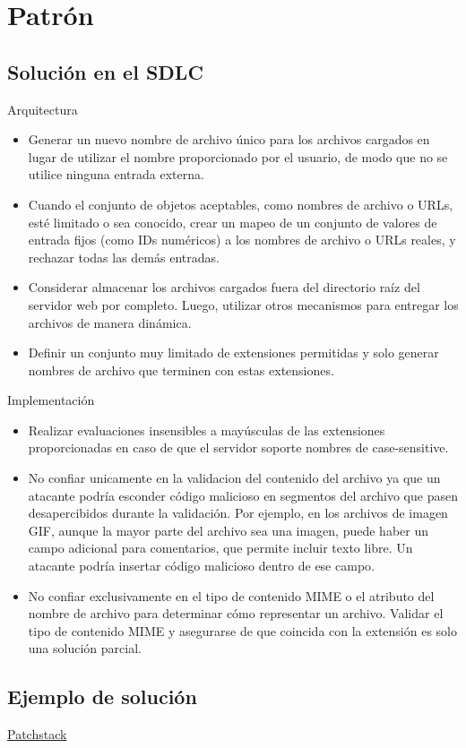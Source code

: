\section{Patrón}
\subsection*{Solución en el SDLC}
Arquitectura
\begin{itemize}
    \item Generar un nuevo nombre de archivo único para los archivos cargados en lugar de utilizar el nombre proporcionado por el usuario, de modo que no se utilice ninguna entrada externa.
    \item Cuando el conjunto de objetos aceptables, como nombres de archivo o URLs, esté limitado o sea conocido, crear un mapeo de un conjunto de valores de entrada fijos (como IDs numéricos) a los nombres de archivo o URLs reales, y rechazar todas las demás entradas.
    \item Considerar almacenar los archivos cargados fuera del directorio raíz del servidor web por completo. Luego, utilizar otros mecanismos para entregar los archivos de manera dinámica.
    \item Definir un conjunto muy limitado de extensiones permitidas y solo generar nombres de archivo que terminen con estas extensiones.
\end{itemize}

Implementación
\begin{itemize}
    \item Realizar evaluaciones insensibles a mayúsculas de las extensiones proporcionadas en caso de que el servidor soporte nombres de case-sensitive.
    \item No confiar unicamente en la validacion del contenido del archivo ya que un atacante podría esconder código malicioso en segmentos del archivo que pasen desapercibidos durante la validación. Por ejemplo, en los archivos de imagen GIF, aunque la mayor parte del archivo sea una imagen, puede haber un campo adicional para comentarios, que permite incluir texto libre. Un atacante podría insertar código malicioso dentro de ese campo.
    \item No confiar exclusivamente en el tipo de contenido MIME o el atributo del nombre de archivo para determinar cómo representar un archivo. Validar el tipo de contenido MIME y asegurarse de que coincida con la extensión es solo una solución parcial.
\end{itemize}
\subsection*{Ejemplo de solución}
\href{https://patchstack.com/academy/wordpress/securing-code/arbitrary-file-upload/}{Patchstack}
